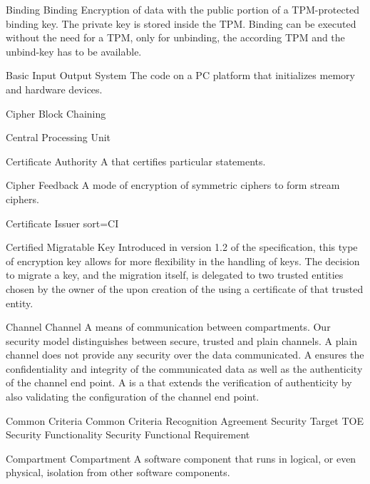 \glosentry
    {Binding}
    {Binding}
    {Encryption of data with the public portion of a TPM-protected binding key. 
The private key is stored inside the TPM. Binding can be executed without
the need for a TPM, only for unbinding, the according TPM and the unbind-key 
has to be available.}

    {Basic Input Output System}
    {The code on a PC platform that initializes memory and hardware devices.}

    {Cipher Block Chaining}

    {Central Processing Unit}

    {Certificate Authority}
    {A \TrustedThirdParty that certifies particular statements.}

    {Cipher Feedback}
    {A mode of encryption of symmetric ciphers to form stream ciphers.}

    {Certificate Issuer}
    {sort=CI}

    {Certified Migratable Key}
    {Introduced in version 1.2 of the \TCG specification, this type of
encryption key allows for more flexibility in the handling of keys. The decision
to migrate a key, and the migration itself, is delegated to two trusted entities
chosen by the owner of the \TPM upon creation of the \CMK using a certificate of
that trusted entity.}

\glosentry
    {Channel}
    {Channel}
    {A means of communication between compartments. Our security model
distinguishes between secure, trusted and plain channels. A plain channel does
not provide any security over the data communicated. A \SecureChannel ensures
the confidentiality and integrity of the communicated data as well as the
authenticity of the channel end point. A \TrustedChannel is a \SecureChannel
that extends the verification of authenticity by also validating the
configuration of the channel end point.}

    {Common Criteria}
    {Common Criteria Recognition Agreement}
    {Security Target}
    {TOE Security Functionality}
    {Security Functional Requirement}


\glosentry
    {Compartment}
    {Compartment}
    {A software component that runs in logical, or even physical, isolation from
other software components.}

